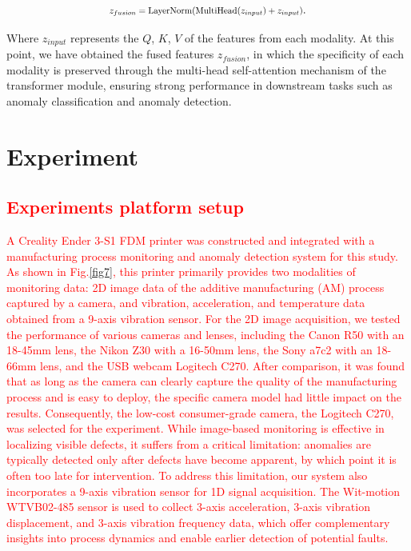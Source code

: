 \documentclass[preprint,12pt]{elsarticle}
\begin{document}
\begin{equation}
  \scalebox{0.8}{$
  {{z}_{fusion}}=\text{LayerNorm}(\text{MultiHead}({{z}_{input}})+{{z}_{input}})
 $}.
  \label{eq14}
\end{equation}

Where ${{z}_{input}}$ represents the $Q$, $K$, $V$ of the features from each modality. At this point, we have obtained the fused features ${{z}_{fusion}}$, in which the specificity of each modality is preserved through the multi-head self-attention mechanism of the transformer module, ensuring strong performance in downstream tasks such as anomaly classification and anomaly detection. 



\section{Experiment}


\subsection{\textcolor{red}{Experiments platform setup}}

\textcolor{red}{A Creality Ender 3-S1 FDM printer was constructed and integrated with a manufacturing process monitoring and anomaly detection system for this study. As shown in Fig.\ref{fig7}, this printer primarily provides two modalities of monitoring data: 2D image data of the additive manufacturing (AM) process captured by a camera, and vibration, acceleration, and temperature data obtained from a 9-axis vibration sensor. For the 2D image acquisition, we tested the performance of various cameras and lenses, including the Canon R50 with an 18-45mm lens, the Nikon Z30 with a 16-50mm lens, the Sony a7c2 with an 18-66mm lens, and the USB webcam Logitech C270. After comparison, it was found that as long as the camera can clearly capture the quality of the manufacturing process and is easy to deploy, the specific camera model had little impact on the results. Consequently, the low-cost consumer-grade camera, the Logitech C270, was selected for the experiment. While image-based monitoring is effective in localizing visible defects, it suffers from a critical limitation: anomalies are typically detected only after defects have become apparent, by which point it is often too late for intervention. To address this limitation, our system also incorporates a 9-axis vibration sensor for 1D signal acquisition. The Wit-motion WTVB02-485 sensor is used to collect 3-axis acceleration, 3-axis vibration displacement, and 3-axis vibration frequency data, which offer complementary insights into process dynamics and enable earlier detection of potential faults.}
\end{document}
